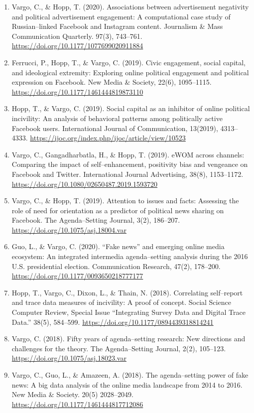 \documentclass[11pt,letterpaper]{article}
\begin{document}
{\begin{enumerate}
\item Vargo, C., \& Hopp, T. (2020). Associations between advertisement negativity and political advertisement engagement: A computational case study of Russian--linked Facebook and Instagram content. Journalism \& Mass Communication Quarterly. 97(3), 743--761. \url{https://doi.org/10.1177/1077699020911884}
\item Ferrucci, P., Hopp, T., \& Vargo, C. (2019). Civic engagement, social capital, and ideological extremity: Exploring online political engagement and political expression on Facebook. New Media \& Society, 22(6), 1095--1115. \url{https://doi.org/10.1177/1461444819873110}
\item Hopp, T., \& Vargo, C. (2019). Social capital as an inhibitor of online political incivility: An analysis of behavioral patterns among politically active Facebook users. International Journal of Communication, 13(2019), 4313--4333. \url{https://ijoc.org/index.php/ijoc/article/view/10523}
\item Vargo, C., Gangadharbatla, H., \& Hopp, T. (2019). eWOM across channels: Comparing the impact of self--enhancement, positivity bias and vengeance on Facebook and Twitter. International Journal Advertising, 38(8), 1153--1172. \url{https://doi.org/10.1080/02650487.2019.1593720}
\item Vargo, C., \& Hopp, T. (2019). Attention to issues and facts: Assessing the role of need for orientation as a predictor of political news sharing on Facebook. The Agenda--Setting Journal, 3(2), 186--207. \url{https://doi.org/10.1075/asj.18004.var}
\item Guo, L., \& Vargo, C. (2020). ``Fake news'' and emerging online media ecosystem: An integrated intermedia agenda--setting analysis during the 2016 U.S. presidential election. Communication Research, 47(2), 178--200. \url{https://doi.org/10.1177/0093650218777177}
\item Hopp, T., Vargo, C., Dixon, L., \& Thain, N. (2018). Correlating self--report and trace data measures of incivility: A proof of concept. Social Science Computer Review, Special Issue ``Integrating Survey Data and Digital Trace Data.'' 38(5), 584--599. \url{https://doi.org/10.1177/0894439318814241}
\item Vargo, C. (2018). Fifty years of agenda--setting research: New directions and challenges for the theory. The Agenda--Setting Journal, 2(2), 105--123. \url{https://doi.org/10.1075/asj.18023.var}
\item Vargo, C., Guo, L., \& Amazeen, A. (2018). The agenda--setting power of fake news: A big data analysis of the online media landscape from 2014 to 2016. New Media \& Society. 20(5) 2028--2049. \url{https://doi.org/10.1177/1461444817712086}

\end{enumerate}}
\end{document}
